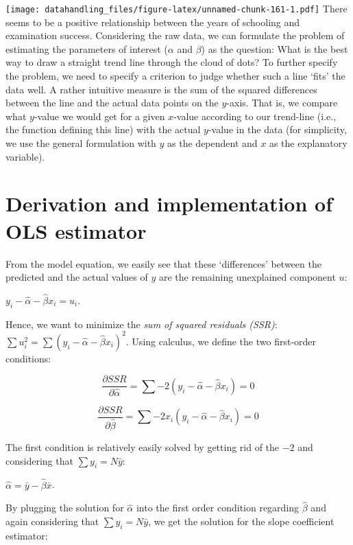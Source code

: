 \documentclass[
  12pt,
]{style/krantz}
\begin{document}
\texttt{[image: datahandling\_files/figure-latex/unnamed-chunk-161-1.pdf]}
There seems to be a positive relationship between the years of schooling and examination success. Considering the raw data, we can formulate the problem of estimating the parameters of interest (\(\alpha\) and \(\beta\)) as the question: What is the best way to draw a straight trend line through the cloud of dots? To further specify the problem, we need to specify a criterion to judge whether such a line `fits' the data well. A rather intuitive measure is the sum of the squared differences between the line and the actual data points on the \(y\)-axis. That is, we compare what \(y\)-value we would get for a given \(x\)-value according to our trend-line (i.e., the function defining this line) with the actual \(y\)-value in the data (for simplicity, we use the general formulation with \(y\) as the dependent and \(x\) as the explanatory variable).

\hypertarget{derivation-and-implementation-of-ols-estimator}{%
\section{Derivation and implementation of OLS estimator}\label{derivation-and-implementation-of-ols-estimator}}

From the model equation, we easily see that these `differences' between the predicted and the actual values of \(y\) are the remaining unexplained component \(u\):

\(y_{i}-\hat{\alpha}-\hat{\beta} x_i=u_i\).

Hence, we want to minimize the \emph{sum of squared residuals (SSR)}: \(\sum{u_i^2}=\sum{(y_{i}-\hat{\alpha}-\hat{\beta} x_i)^2}\). Using calculus, we define the two first-order conditions:

\[\frac{\partial SSR}{\partial \hat{\alpha}}=\sum{-2(y_{i}-\hat{\alpha}-\hat{\beta} x_i)}=0\]

\[\frac{\partial SSR}{\partial \hat{\beta}}=\sum{-2x_i(y_{i}-\hat{\alpha}-\hat{\beta} x_i)}=0\]

The first condition is relatively easily solved by getting rid of the \(-2\) and considering that \(\sum{y_i}=N\bar{y}\):

\(\hat{\alpha}=\bar{y}-\hat{\beta}\bar{x}\).

By plugging the solution for \(\hat{\alpha}\) into the first order condition regarding \(\hat{\beta}\) and again considering that \(\sum{y_i}=N\bar{y}\), we get the solution for the slope coefficient estimator:
\end{document}

